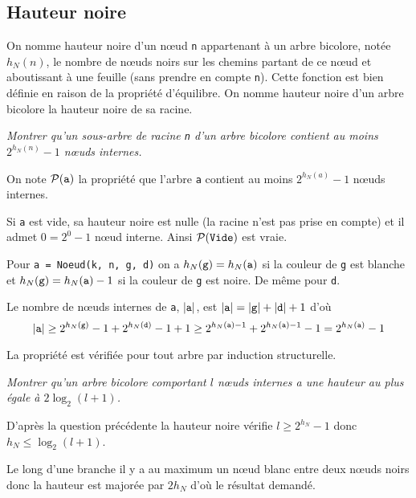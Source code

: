 \subsection{Hauteur noire}
On nomme hauteur noire d’un nœud {\tt n} appartenant à un arbre bicolore, notée $h_N(n)$,  le nombre de nœuds noirs sur les chemins partant de ce nœud et
aboutissant à une feuille (sans prendre en compte {\tt n}). Cette fonction est bien définie en raison de la  propriété d'équilibre. On nomme hauteur noire d’un arbre bicolore la hauteur noire de sa racine.
\begin{Exercise}\it 
Montrer qu’un sous-arbre de racine {\tt n} d’un arbre bicolore contient au moins $2^{h_N(n)}- 1$ nœuds internes.
\end{Exercise}
\begin{Answer} 

On note ${\cal P}({\tt a})$ la propriété que l'arbre {\tt a} contient au moins  $2^{h_N(a)}- 1$ nœuds internes.

Si {\tt a} est vide, sa hauteur noire est nulle (la racine n'est pas prise en compte) et il admet $0 = 2^0-1$ nœud interne. Ainsi ${\cal P}(\texttt{Vide})$ est vraie.

Pour {\tt a  = Noeud(k, n, g, d)} on a $h_N({\tt g})=h_N({\tt a})$ si la couleur de {\tt g} est blanche et $h_N({\tt g})=h_N({\tt a})-1$ si la couleur de {\tt g} est noire. De même pour {\tt d}.

Le nombre de nœuds internes de {\tt a}, $|{\tt a}|$, est $|{\tt a}| = |{\tt g}| + |{\tt d}| + 1$ d'où
\[|{\tt a}| \ge 2^{h_N({\tt g})}- 1 + 2^{h_N({\tt d})}- 1 +1 \ge 2^{h_N({\tt a})-1} + 2^{h_N({\tt a})-1}- 1 = 2^{h_N({\tt a})}- 1\]

La propriété est vérifiée pour tout arbre par induction structurelle.
\end{Answer}
\begin{Exercise}\it Montrer qu’un arbre bicolore comportant $l$ nœuds internes a une hauteur au plus égale à $2\log_2 ( l + 1 )$.
\end{Exercise}
\begin{Answer}

D'après la question précédente la hauteur noire vérifie $l \ge 2^{h_N}-1$ donc $h_N \le \log_2(l+1)$.

Le long d'une branche il y a au maximum un nœud blanc entre deux nœuds noirs donc la hauteur est majorée par $2 h_N$ d'où le résultat demandé.
\end{Answer}
